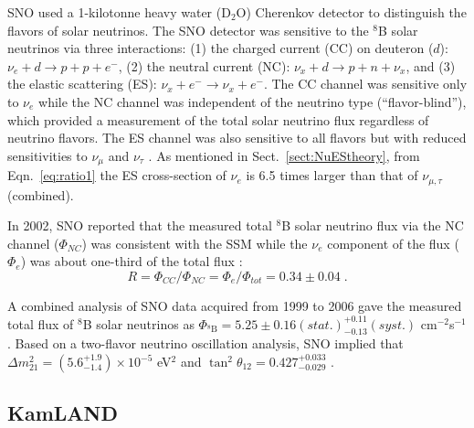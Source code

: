 SNO used a 1-kilotonne heavy water (D$_2$O) Cherenkov detector to distinguish the flavors of solar neutrinos. The SNO detector was sensitive to the $^8$B solar neutrinos via three interactions: (1) the charged current (CC) on deuteron ($d$): $\nu_e+d\to p+p+e^-$, (2) the neutral current (NC): $\nu_x+d\to p+n+\nu_x$, and (3) the elastic scattering (ES): $\nu_x+e^-\to \nu_x+e^-$. The CC channel was sensitive only to $\nu_e$ while the NC channel was independent of the neutrino type (``flavor-blind''), which provided a measurement of the total solar neutrino flux regardless of neutrino flavors. The ES channel was also sensitive to all flavors but with reduced sensitivities to $\nu_\mu$ and $\nu_\tau$ \cite{ahmad2002direct}. As mentioned in Sect.~\ref{sect:NuEStheory}, from Eqn.~\ref{eq:ratio1} the ES cross-section of $\nu_e$ is 6.5 times larger than that of $\nu_{\mu,\tau}$ (combined). 

In 2002, SNO reported that the measured total $^8$B solar neutrino flux via the NC channel ($\Phi_{NC}$) was consistent with the SSM while the $\nu_e$
component of the flux ($\Phi_e$) was about one-third of the total flux \cite{ahmad2002direct}:
\begin{equation}
R = \Phi_{CC}/\Phi_{NC} = \Phi_e/\Phi_{tot}=0.34\pm 0.04 \; .
\end{equation}

A combined analysis of SNO data acquired from 1999 to 2006 gave the measured total flux of $^8$B solar neutrinos as $\Phi_{^8\mathrm{B}}=5.25\pm0.16(stat.)^{+0.11}_{-0.13}(syst.)$ cm$^{-2}$s$^{-1}$. Based on a two-flavor neutrino oscillation analysis, SNO implied that $\Delta m^2_{21}=(5.6^{+1.9}_{-1.4})\times 10^{-5}$ eV$^2$ and $\tan^2\theta_{12}=0.427^{+0.033}_{-0.029}$ \cite{aharmim2013combined}.

\subsection{KamLAND}

